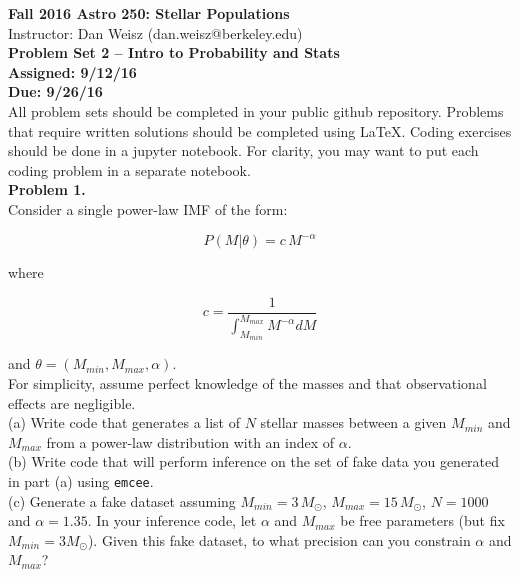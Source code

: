\documentclass{article}
\begin{document}
\noindent \textbf{\large{Fall 2016 Astro 250: Stellar Populations}} \\
\noindent Instructor: Dan Weisz (dan.weisz@berkeley.edu) \\
\textbf{\large{Problem Set 2 -- Intro to Probability and Stats}} \\
\textbf{{Assigned: 9/12/16}} \\
\textbf{{Due: 9/26/16}} \\

\noindent All problem sets should be completed in your public github repository.  Problems that require written solutions should be completed using LaTeX.  Coding exercises should be done in a jupyter notebook. For clarity, you may want to put each coding problem in a separate notebook.\\


\noindent \textbf{Problem 1.} \\ 

Consider a single power-law IMF of the form:

\begin{equation}
P(M | \theta) = c \, M^{-\alpha}
\end{equation}

\noindent where 

\begin{equation}
c = \frac{1}{\int_{M_{min}}^{M_{max}} M^{-\alpha} dM} 
\end{equation}

\noindent and $\theta = (M_{min}, M_{max}, \alpha )$. \\

For simplicity, assume perfect knowledge of the masses and that observational effects are negligible.  \\


(a) Write code that generates a list of $N$ stellar masses between a given $M_{min}$ and $M_{max}$ from a power-law distribution with an index of $\alpha$.\\

(b) Write code that will perform inference on the set of fake data you generated in part (a) using \texttt{emcee}.\\

(c) Generate a fake dataset assuming $M_{min}=3 \, M_{\odot}$, $M_{max}=15 \, M_{\odot}$, $N=1000$ and $\alpha=1.35$.  In your inference code, let $\alpha$ and $M_{max}$ be free parameters (but fix $M_{min}=3 M_{\odot}$).  Given this fake dataset, to what precision can you constrain $\alpha$ and $M_{max}$? \\
\end{document}
